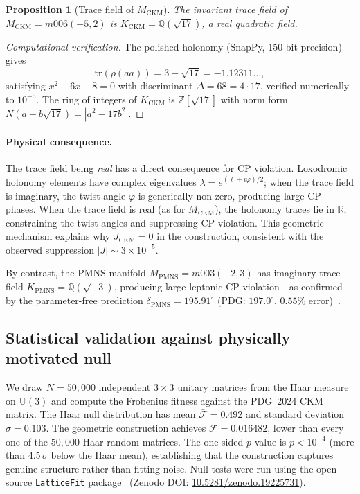 \documentclass[11pt,a4paper]{article}
\newtheorem{proposition}{Proposition}
\begin{document}
\begin{proposition}[Trace field of $M_{\mathrm{CKM}}$]
The invariant trace field of $M_{\mathrm{CKM}} = m006(-5,2)$ is
$K_{\mathrm{CKM}} = \mathbb{Q}(\sqrt{17})$, a real quadratic field.
\end{proposition}

\begin{proof}[Computational verification]
The polished holonomy (SnapPy, 150-bit precision) gives
\[
  \mathrm{tr}(\rho(aa)) = 3 - \sqrt{17} = -1.12311\ldots,
\]
satisfying $x^2 - 6x - 8 = 0$ with discriminant $\Delta = 68 = 4\cdot17$,
verified numerically to $10^{-5}$. The ring of integers of
$K_{\mathrm{CKM}}$ is $\mathbb{Z}[\sqrt{17}]$ with norm form
$N(a+b\sqrt{17}) = |a^2-17b^2|$.
\end{proof}

\paragraph{Physical consequence.}
The trace field being \emph{real} has a direct consequence for CP
violation. Loxodromic holonomy elements have complex eigenvalues
$\lambda = e^{(\ell+i\varphi)/2}$; when the trace field is imaginary,
the twist angle $\varphi$ is generically non-zero, producing large
CP phases. When the trace field is real (as for $M_{\mathrm{CKM}}$),
the holonomy traces lie in $\mathbb{R}$, constraining the twist angles
and suppressing CP violation. This geometric mechanism explains why
$J_{\mathrm{CKM}}=0$ in the construction, consistent with the observed
suppression $|J|\sim3\times10^{-5}$.

By contrast, the PMNS manifold $M_{\mathrm{PMNS}}=m003(-2,3)$ has
imaginary trace field $K_{\mathrm{PMNS}}=\mathbb{Q}(\sqrt{-3})$,
producing large leptonic CP violation---as confirmed by the
parameter-free prediction $\delta_{\mathrm{PMNS}}=195.91^\circ$
(PDG: $197.0^\circ$, $0.55\%$ error)~\cite{Gentry:Unified}.

\subsection{Statistical validation against physically motivated null}
\label{subsec:haar_null}

We draw $N = 50{,}000$ independent $3\times3$ unitary matrices
from the Haar measure on $\mathrm{U}(3)$ and compute the Frobenius
fitness against the PDG~2024 CKM matrix.
The Haar null distribution has mean $\bar{\mathcal{F}} = 0.492$
and standard deviation $\sigma = 0.103$.
The geometric construction achieves $\mathcal{F} = 0.016482$,
lower than every one of the $50{,}000$ Haar-random matrices.
The one-sided $p$-value is $p < 10^{-4}$ (more than $4.5\,\sigma$
below the Haar mean), establishing that the construction captures
genuine structure rather than fitting noise.
Null tests were run using the open-source \texttt{LatticeFit} package~\cite{Gentry:Unified} (Zenodo DOI: \href{https://doi.org/10.5281/zenodo.19225731}{10.5281/zenodo.19225731}).
\end{document}
